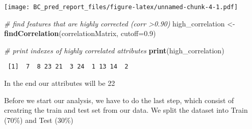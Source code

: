 \documentclass[]{article}
\newenvironment{Shaded}{\begin{snugshade}}{\end{snugshade}}
\newcommand{\CommentTok}[1]{\textcolor[rgb]{0.56,0.35,0.01}{\textit{#1}}}
\newcommand{\DataTypeTok}[1]{\textcolor[rgb]{0.13,0.29,0.53}{#1}}
\newcommand{\DecValTok}[1]{\textcolor[rgb]{0.00,0.00,0.81}{#1}}
\newcommand{\FloatTok}[1]{\textcolor[rgb]{0.00,0.00,0.81}{#1}}
\newcommand{\KeywordTok}[1]{\textcolor[rgb]{0.13,0.29,0.53}{\textbf{#1}}}
\newcommand{\NormalTok}[1]{#1}
\newcommand{\OperatorTok}[1]{\textcolor[rgb]{0.81,0.36,0.00}{\textbf{#1}}}
\newcommand{\OtherTok}[1]{\textcolor[rgb]{0.56,0.35,0.01}{#1}}
\newcommand{\StringTok}[1]{\textcolor[rgb]{0.31,0.60,0.02}{#1}}
\begin{document}
\texttt{[image: BC\_pred\_report\_files/figure-latex/unnamed-chunk-4-1.pdf]}

\begin{Shaded}
\begin{Highlighting}[]
\CommentTok{# find features that are highly corrected (corr >0.90)}
\NormalTok{high_correlation <-}\StringTok{ }\KeywordTok{findCorrelation}\NormalTok{(correlationMatrix, }\DataTypeTok{cutoff=}\FloatTok{0.9}\NormalTok{)}


\CommentTok{# print indexes of highly correlated attributes}
\KeywordTok{print}\NormalTok{(high_correlation)}
\end{Highlighting}
\end{Shaded}

\begin{verbatim}
 [1]  7  8 23 21  3 24  1 13 14  2
\end{verbatim}

\begin{Shaded}
\end{Shaded}

In the end our attributes will be 22

Before we start our analysis, we have to do the last step, which consist
of creatring the train and test set from our data. We split the dataset
into Train (70\%) and Test (30\%)

\begin{Shaded}
\end{Shaded}
\end{document}

